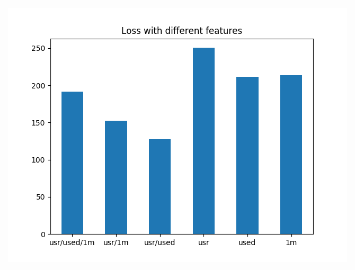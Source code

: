 \documentclass[aspectratio=169,11pt,hyperref={colorlinks=true}]{beamer}
\begin{document}
\begin{frame}
\begin{columns}
\begin{center}
\begin{figure}
        \end{figure}
        \begin{figure}
          \includegraphics[width=0.8\textwidth,height=0.4\textheight]{graphs/loss_by_feature-status.png}
        \end{figure}
      \end{center}
  \end{columns}
\end{frame}
\end{document}
